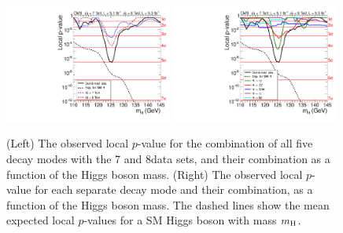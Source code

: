 \documentclass[11pt,twoside,a4paper,cmspaper,final,collab]{cms-tdr}
\begin{document}
\begin{figure} %
\centering
\includegraphics[width=0.49\textwidth]{figures/comb/sqr_pvala_all_energy_smallGGScale_wideX} \hfill
\includegraphics[width=0.49\textwidth]{figures/comb/sqr_pvala_all_bydecay_smallGGScale_wideX}
\caption{
(Left) The observed local $p$-value for the combination of all five decay modes with the 7 and 8\TeV data sets,
and their combination
as a function of the Higgs boson mass.
(Right) The observed local $p$-value for each separate  decay mode
and their combination, as a function of the Higgs boson mass.
The dashed lines show the mean expected local $p$-values for
a SM Higgs boson with  mass $m_{\mathrm{H}}$.
}
\label{fig:pvalue}
\end{figure}
\end{document}

